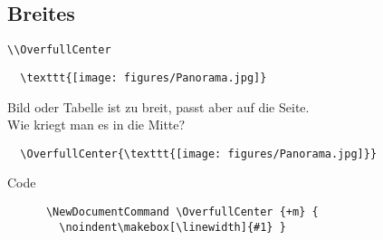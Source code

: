 \subsection{Breites}

\begin{frame}[fragile]{\lstinline+\\OverfullCenter+}
  \begin{lstlisting}
  \texttt{[image: figures/Panorama.jpg]}
  \end{lstlisting}
  Bild oder Tabelle ist zu breit, passt aber auf die Seite.\\
  Wie kriegt man es in die Mitte?
  \begin{lstlisting}
  \OverfullCenter{\texttt{[image: figures/Panorama.jpg]}}
  \end{lstlisting}

  \begin{block}{Code}
    \begin{lstlisting}
      \NewDocumentCommand \OverfullCenter {+m} {
        \noindent\makebox[\linewidth]{#1} }
    \end{lstlisting}
  \end{block}
\end{frame}

